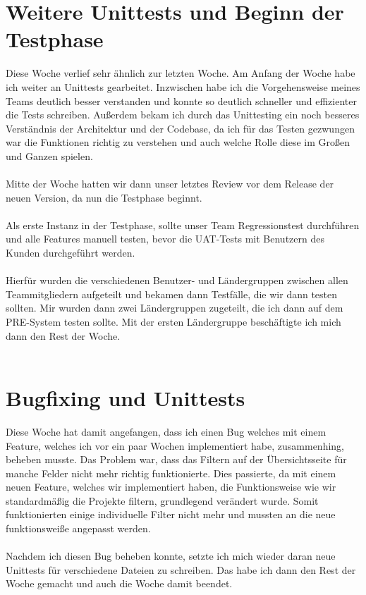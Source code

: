 \section{Weitere Unittests und Beginn der Testphase}
Diese Woche verlief sehr ähnlich zur letzten Woche. Am Anfang der Woche habe ich weiter an Unittests gearbeitet. Inzwischen habe ich die Vorgehensweise meines Teams deutlich besser verstanden und konnte so deutlich schneller und effizienter die Tests schreiben. Außerdem bekam ich durch das Unittesting ein noch besseres Verständnis der Architektur und der Codebase, da ich für das Testen gezwungen war die Funktionen richtig zu verstehen und auch welche Rolle diese im Großen und Ganzen spielen. \\\\
Mitte der Woche hatten wir dann unser letztes Review vor dem Release der neuen Version, da nun die Testphase beginnt.  \\\\
Als erste Instanz in der Testphase, sollte unser Team Regressionstest durchführen und alle Features manuell testen, bevor die UAT-Tests mit Benutzern des Kunden durchgeführt werden. \\\\
Hierfür wurden die verschiedenen Benutzer- und Ländergruppen zwischen allen Teammitgliedern aufgeteilt und bekamen dann Testfälle, die wir dann testen sollten. Mir wurden dann zwei Ländergruppen zugeteilt, die ich dann auf dem PRE-System testen sollte. Mit der ersten Ländergruppe beschäftigte ich mich dann den Rest der Woche. \\\\

\section{Bugfixing und Unittests}
Diese Woche hat damit angefangen, dass ich einen Bug welches mit einem Feature, welches ich vor ein paar Wochen implementiert habe, zusammenhing, beheben musste. Das Problem war, dass das Filtern auf der Übersichtsseite für manche Felder nicht mehr richtig funktionierte. Dies passierte, da mit einem neuen Feature, welches wir implementiert haben, die Funktionsweise wie wir standardmäßig die Projekte filtern, grundlegend verändert wurde. Somit funktionierten einige individuelle Filter nicht mehr und mussten an die neue funktionsweiße angepasst werden. \\\\
Nachdem ich diesen Bug beheben konnte, setzte ich mich wieder daran neue Unittests für verschiedene Dateien zu schreiben. Das habe ich dann den Rest der Woche gemacht und auch die Woche damit beendet. \\\\

